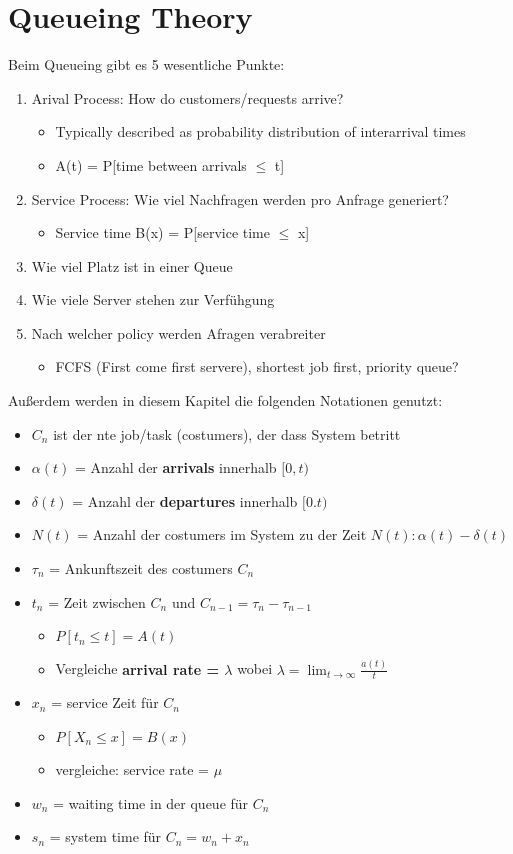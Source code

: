 \section{Queueing Theory}
	Beim Queueing gibt es 5 wesentliche Punkte:
	\begin{enumerate}
		\item Arival Process: How do customers/requests arrive?
			\begin{itemize}
				\item Typically described as probability distribution of interarrival times
				\item A(t) = P[time between arrivals $\le$ t]
			\end{itemize}
		\item Service Process: Wie viel Nachfragen werden pro Anfrage generiert?
			\begin{itemize}
				\item Service time B(x) = P[service time $\le$ x]
			\end{itemize}
		\item Wie viel Platz ist in einer Queue
		\item Wie viele Server stehen zur Verfühgung
		\item Nach welcher policy werden Afragen verabreiter
			\begin{itemize}
				\item FCFS (First come first servere), shortest job first, priority queue?
			\end{itemize}
	\end{enumerate}
	Außerdem werden in diesem Kapitel die folgenden Notationen genutzt:
	\begin{itemize}
		\item $C_n$ ist der nte job/task (costumers), der dass System betritt
		\item $\alpha(t)$ = Anzahl der \textbf{arrivals} innerhalb $[0,t)$
		\item $\delta(t)$ = Anzahl der \textbf{departures} innerhalb $[0.t)$
		\item $N(t)$ = Anzahl der costumers im System zu der Zeit $N(t): \alpha(t)-\delta(t)$
		\item $\tau_n$ = Ankunftszeit des costumers $C_n$
		\item $t_n$ = Zeit zwischen $C_n$ und $C_{n-1}=\tau_n-\tau_{n-1}$ 
			\begin{itemize}
				\item $P[t_n\le t] = A(t)$
				\item Vergleiche \textbf{arrival rate = $\lambda$} wobei $\lambda = \lim_{t \to \infty} \frac{a(t)}{t}$
			\end{itemize}
		\item $x_n$ = service Zeit für $C_n$
			\begin{itemize}
				\item $P[X_n \le x] = B(x)$
				\item vergleiche: service rate = $\mu$ 
			\end{itemize}
		\item $w_n$ = waiting time in der queue für $C_n$
		\item $s_n$ = system time für $C_n = w_n + x_n$
	\end{itemize}
